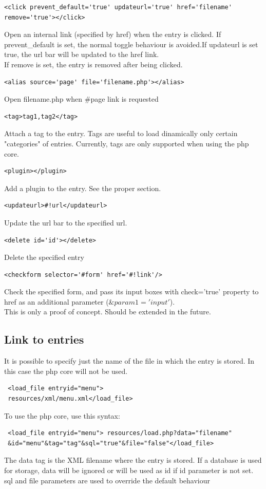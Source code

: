 \documentclass[a4paper,12pt]{article}
\begin{document}
\begin{list}{-}{}
\item \begin{verbatim}
<click prevent_default='true' updateurl='true' href='filename' remove='true'></click>
\end{verbatim}
Open an internal link (specified by href) when the entry is clicked. If prevent\_default is set, the normal toggle behaviour is avoided.If updateurl is set true, the url bar will be updated to the href link.\\
If remove is set, the entry is removed after being clicked.
\item \begin{verbatim}
<alias source='page' file='filename.php'></alias>
\end{verbatim}
Open filename.php when \#page link is requested
\item \begin{verbatim}
<tag>tag1,tag2</tag>
\end{verbatim}
Attach a tag to the entry. Tags are useful to load dinamically only certain "categories" of entries. Currently, tags are only supported when using the php core.
\item \begin{verbatim}
<plugin></plugin>
\end{verbatim}
Add a plugin to the entry. See the proper section.
\item \begin{verbatim}
<updateurl>#!url</updateurl>
\end{verbatim}
Update the url bar to the specified url.
\item \begin{verbatim}
<delete id='id'></delete>
\end{verbatim}
Delete the specified entry
\item \begin{verbatim}
<checkform selector='#form' href='#!link'/>
\end{verbatim}
Check the specified form, and pass its input boxes with check='true' property to href as an additional parameter ($\&param1='input'$).\\
This is only a proof of concept. Should be extended in the future.
\end{list}
\normalsize
\subsection{Link to entries}
It is possible to specify just the name of the file in which the entry is stored. In this case the php core will not be used. 
\begin{verbatim}
 <load_file entryid="menu">
 resources/xml/menu.xml</load_file>
\end{verbatim}
To use the php core, use this syntax:
\begin{verbatim}
 <load_file entryid="menu"> resources/load.php?data="filename"
 &id="menu"&tag="tag"&sql="true"&file="false"</load_file>
\end{verbatim}
The data tag is the XML filename where the entry is stored. If a database is used for storage, data will be ignored or will be used as id if id parameter is not set.\\
sql and file parameters are used to override the default behaviour
\end{document}
